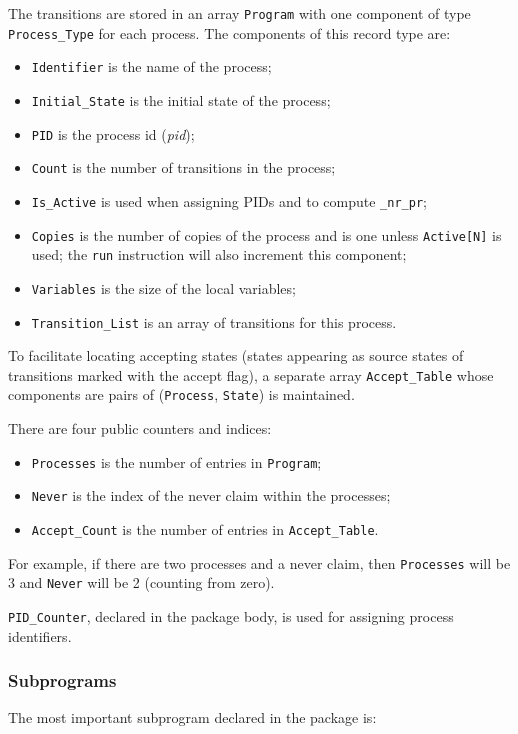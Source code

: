 \documentclass[11pt]{article}
\newcommand*{\p}[1]{\texttt{#1}}
\begin{document}
The transitions are stored in an array \p{Program} with one component of
type \p{Process\_Type} for each process. The components of this record
type are:

\begin{itemize}
\item \p{Identifier} is the name of the process;
\item \p{Initial\_State} is the initial state of the process;
\item \p{PID} is the process id (\emph{pid});
\item \p{Count} is the number of transitions in the process;
\item \p{Is\_Active} is used when assigning PIDs and to compute \p{\_nr\_pr};
\item \p{Copies} is the number of copies of the
process and is one unless \p{Active[N]} is used; the \p{run} instruction
will also increment this component;
\item \p{Variables} is the size of the local variables;
\item \p{Transition\_List} is an array of transitions for this process.
\end{itemize}

To facilitate locating accepting states (states appearing as source
states of transitions marked with the accept flag), a separate array
\p{Accept\_Table} whose components are pairs of (\p{Process}, \p{State})
is maintained.

There are four public counters and indices:
\begin{itemize}
\item \p{Processes} is the number of entries in \p{Program};
\item \p{Never} is the index of the never claim within the processes;
\item \p{Accept\_Count} is the number of entries in \p{Accept\_Table}.
\end{itemize}
For example, if there are two processes and a never claim, then
\p{Processes} will be 3 and \p{Never} will be 2 (counting from zero).

\p{PID\_Counter}, declared in the package body,
is used for assigning process identifiers.

\subsubsection*{Subprograms}

The most important subprogram declared in the package is:
\end{document}
